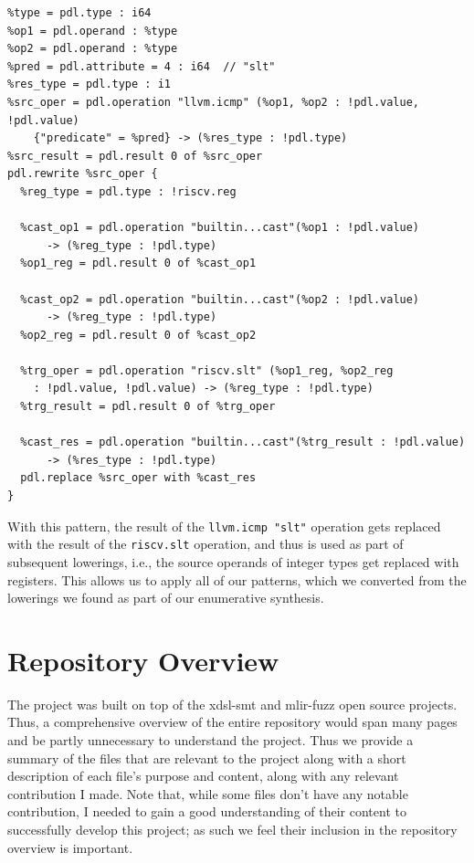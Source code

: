 \begin{verbatim}
%type = pdl.type : i64
%op1 = pdl.operand : %type
%op2 = pdl.operand : %type
%pred = pdl.attribute = 4 : i64  // "slt"
%res_type = pdl.type : i1
%src_oper = pdl.operation "llvm.icmp" (%op1, %op2 : !pdl.value, !pdl.value) 
    {"predicate" = %pred} -> (%res_type : !pdl.type)
%src_result = pdl.result 0 of %src_oper
pdl.rewrite %src_oper {
  %reg_type = pdl.type : !riscv.reg

  %cast_op1 = pdl.operation "builtin...cast"(%op1 : !pdl.value) 
      -> (%reg_type : !pdl.type)
  %op1_reg = pdl.result 0 of %cast_op1

  %cast_op2 = pdl.operation "builtin...cast"(%op2 : !pdl.value) 
      -> (%reg_type : !pdl.type)
  %op2_reg = pdl.result 0 of %cast_op2

  %trg_oper = pdl.operation "riscv.slt" (%op1_reg, %op2_reg 
    : !pdl.value, !pdl.value) -> (%reg_type : !pdl.type)
  %trg_result = pdl.result 0 of %trg_oper

  %cast_res = pdl.operation "builtin...cast"(%trg_result : !pdl.value) 
      -> (%res_type : !pdl.type)
  pdl.replace %src_oper with %cast_res
}
\end{verbatim}

With this pattern, the result of the \texttt{llvm.icmp "slt"} operation gets replaced with the result
of the \texttt{riscv.slt} operation, and thus is used as part of subsequent lowerings, i.e., the source
operands of integer types get replaced with registers. This allows us to apply all of our patterns, which 
we converted from the lowerings we found as part of our enumerative synthesis.

\clearpage
\section{Repository Overview}

The project was built on top of the xdsl-smt and mlir-fuzz open source projects. Thus,
a comprehensive overview of the entire repository would span many pages and be partly 
unnecessary to understand the project. Thus we provide a summary of the files that 
are relevant to the project along with a short description of each file's purpose and 
content, along with any relevant contribution I made. Note that, while some 
files don't have any notable contribution, I needed to gain a good 
understanding of their content to successfully develop this project; as such we feel their
inclusion in the repository overview is important.

